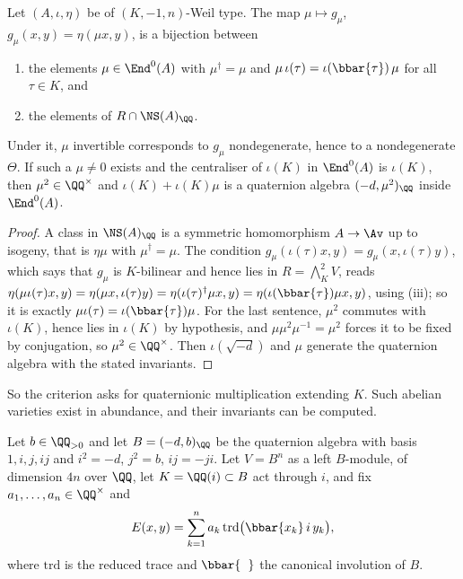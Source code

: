 \begin{lemma}\label{lem:Rendomorphism}
Let $(A,\iota,\eta)$ be of $(K,-1,n)$-Weil type. The map $\mu\mapsto
g_{\mu}$, $g_{\mu}(x,y)=\eta(\mu x,y)$, is a bijection between
\begin{enumerate}[label=\textup{(\alph*)},nosep]
\item the elements $\mu\in\End^{0}(A)$ with $\mu^{\dagger}=\mu$ and
  $\mu\,\iota(\tau)=\iota(\bbar{\tau})\,\mu$ for all $\tau\in K$, and
\item the elements of $R\cap\NS(A)_{\QQ}$.
\end{enumerate}
Under it, $\mu$ invertible corresponds to $g_{\mu}$ nondegenerate, hence to a
nondegenerate $\Theta$. If such a $\mu\ne0$ exists and the centraliser of
$\iota(K)$ in $\End^{0}(A)$ is $\iota(K)$, then $\mu^{2}\in\QQ^{\times}$ and
$\iota(K)+\iota(K)\mu$ is a quaternion algebra $(-d,\mu^{2})_{\QQ}$ inside
$\End^{0}(A)$.
\end{lemma}

\begin{proof}
A class in $\NS(A)_{\QQ}$ is a symmetric homomorphism $A\to\Av$ up to isogeny,
that is $\eta\mu$ with $\mu^{\dagger}=\mu$. The condition
$g_{\mu}(\iota(\tau)x,y)=g_{\mu}(x,\iota(\tau)y)$, which says that $g_{\mu}$ is
$K$-bilinear and hence lies in $R=\bigwedge^{2}_{K}V$, reads
$\eta(\mu\iota(\tau)x,y)=\eta(\mu x,\iota(\tau)y)=\eta(\iota(\tau)^{\dagger}\mu
x,y)=\eta(\iota(\bbar{\tau})\mu x,y)$, using (iii); so it is
exactly $\mu\iota(\tau)=\iota(\bbar{\tau})\mu$. For the last sentence,
$\mu^{2}$ commutes with $\iota(K)$, hence lies in $\iota(K)$ by hypothesis, and
$\mu\mu^{2}\mu^{-1}=\mu^{2}$ forces it to be fixed by conjugation, so
$\mu^{2}\in\QQ^{\times}$. Then $\iota(\sqrt{-d})$ and $\mu$ generate the
quaternion algebra with the stated invariants.
\end{proof}

So the criterion asks for quaternionic multiplication extending $K$. Such
abelian varieties exist in abundance, and their invariants can be computed.

\begin{setupenv}\label{setup:quat}
Let $b\in\QQ_{>0}$ and let $B=(-d,b)_{\QQ}$ be the quaternion algebra with
basis $1,i,j,ij$ and $i^{2}=-d$, $j^{2}=b$, $ij=-ji$. Let
$V=B^{n}$ as a left $B$-module, of dimension $4n$ over $\QQ$, let
$K=\QQ(i)\subset B$ act through $i$, and fix $a_{1},\dots,a_{n}\in\QQ^{\times}$
and
\begin{equation}\label{eq:quatE}
  E(x,y)=\sum_{k=1}^{n}a_{k}\,\mathrm{trd}\bigl(\bbar{x_{k}}\,i\,y_{k}\bigr),
\end{equation}
where $\mathrm{trd}$ is the reduced trace and $\bbar{\phantom{x}}$ the
canonical involution of $B$.
\end{setupenv}

